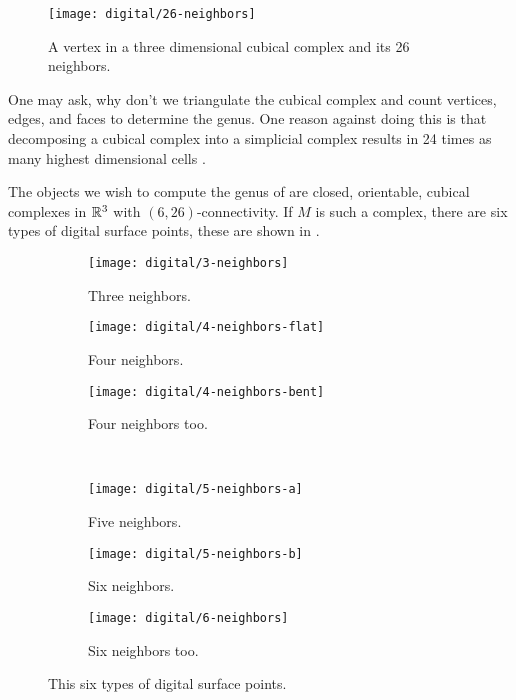 \begin{figure}[htb]
        \centering
        \texttt{[image: digital/26-neighbors]}
		\caption{A vertex in a three dimensional cubical complex and its 26 neighbors.
		\label{fig:26-neighbors}}
\end{figure}

One may ask, why don't we triangulate the cubical complex and
count vertices, edges, and faces to determine the genus.
One reason against doing this is that 
decomposing a cubical complex into a simplicial complex
results in 24 times as many highest dimensional cells \cite{Kaczynski2003}.


The objects we wish to compute the genus of are closed, orientable, cubical complexes in $\mathbb{R}^3$ with $(6,26)$-connectivity.
If $M$ is such a complex, there are
six types of digital surface points, these are shown in .


\begin{figure}[htb]
        \centering
        \begin{subfigure}[b]{0.2\textwidth}
        \texttt{[image: digital/3-neighbors]}
        \caption{Three neighbors.}
          \label{fig:3-neighbors}
        \end{subfigure}
          \hspace{.3cm}
         \begin{subfigure}[b]{0.25\textwidth}
        \texttt{[image: digital/4-neighbors-flat]}
        \caption{Four neighbors.}
        \label{fig:4-neighbors-flat}
        \end{subfigure}
         \hspace{.3cm}
         \begin{subfigure}[b]{0.2\textwidth}
        \texttt{[image: digital/4-neighbors-bent]}
        \caption{Four neighbors too.}
        \label{fig:4-neighbors-bent}
        \end{subfigure}\\
         \begin{subfigure}[b]{0.25\textwidth}
        \texttt{[image: digital/5-neighbors-a]}
        \caption{Five neighbors.}
          \label{fig:1-neighbors}
        \end{subfigure}
          \hspace{.2cm}
         \begin{subfigure}[b]{0.25\textwidth}
        \texttt{[image: digital/5-neighbors-b]}
        \caption{Six neighbors.}
        \label{fig:4-neighbors-flat}
        \end{subfigure}
         \hspace{.2cm}
         \begin{subfigure}[b]{0.25\textwidth}
        \texttt{[image: digital/6-neighbors]}
        \caption{Six neighbors too.}
        \label{fig:6-neighbors}
        \end{subfigure}
		\caption{This six types of digital surface points.
		\label{fig:6-types}}
\end{figure}

